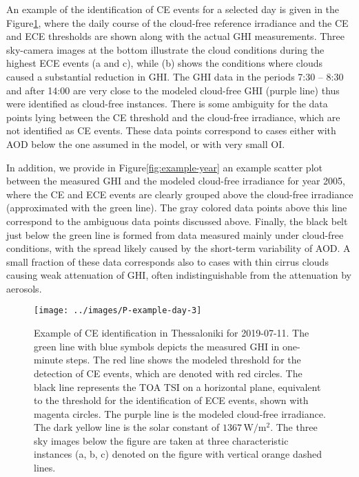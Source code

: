 \documentclass[preprint, 5p,
authoryear]{elsarticle} %
\begin{document}
An example of the identification of CE events for a selected day is
given in the Figure\nobreakspace{}\ref{fig:example-day}, where the daily
course of the cloud-free reference irradiance and the CE and ECE
thresholds are shown along with the actual GHI measurements. Three
sky-camera images at the bottom illustrate the cloud conditions during
the highest ECE events (a and c), while (b) shows the conditions where
clouds caused a substantial reduction in GHI. The GHI data in the
periods 7:30 -- 8:30 and after 14:00 are very close to the modeled
cloud-free GHI (purple line) thus were identified as cloud-free
instances. There is some ambiguity for the data points lying between the
CE threshold and the cloud-free irradiance, which are not identified as
CE events. These data points correspond to cases either with AOD below
the one assumed in the model, or with very small OI.

In addition, we provide in Figure\nobreakspace{}\ref{fig:example-year}
an example scatter plot between the measured GHI and the modeled
cloud-free irradiance for year 2005, where the CE and ECE events are
clearly grouped above the cloud-free irradiance (approximated with the
green line). The gray colored data points above this line correspond to
the ambiguous data points discussed above. Finally, the black belt just
below the green line is formed from data measured mainly under
cloud-free conditions, with the spread likely caused by the short-term
variability of AOD. A small fraction of these data corresponds also to
cases with thin cirrus clouds causing weak attenuation of GHI, often
indistinguishable from the attenuation by aerosols.

\begin{figure}[H]

{\centering \texttt{[image: ../images/P-example-day-3]} 

}

\caption{Example of CE identification in Thessaloniki for 2019-07-11. The green line with blue symbols depicts the measured GHI in one-minute steps. The red line shows the modeled threshold for the detection of CE events, which are denoted with red circles. The black line represents the TOA TSI on a horizontal plane, equivalent to the threshold for the identification of ECE events, shown with magenta circles. The purple line is the modeled cloud-free irradiance. The dark yellow line is the solar constant of $1367\,\text{W}/\text{m}^{2}$. The three sky images below the figure are taken at three characteristic instances (a, b, c) denoted on the figure with vertical orange dashed lines.}\label{fig:example-day}
\end{figure}
\end{document}
